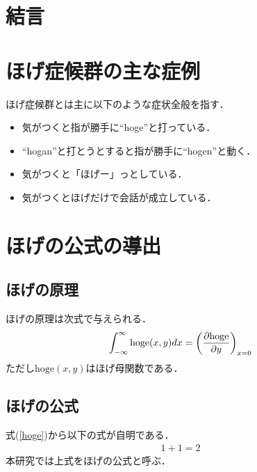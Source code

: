 \begin{small}
\section{結言}

\section{ほげ症候群の主な症例}
ほげ症候群とは主に以下のような症状全般を指す\cite{Hondo:hohoge2006}．
\begin{itemize}
\item 気がつくと指が勝手に``hoge''と打っている．
\item ``hogan''と打とうとすると指が勝手に``hogen''と動く．
\item 気がつくと「ほげー」っとしている．
\item 気がつくとほげだけで会話が成立している．
\end{itemize}
\section{ほげの公式の導出}
\subsection{ほげの原理}
ほげの原理は次式で与えられる\cite{Kawamura:hogege2010}．
\begin{eqnarray}
\int_{-\infty}^\infty \mathrm{hoge}(x,y) dx = \left( \frac{\partial \mathrm{hoge}}{\partial y} \label{hoge} \right)_{x = 0}
\end{eqnarray}
ただし$\mathrm{hoge}(x,y)$はほげ母関数である．
\subsection{ほげの公式}
式(\ref{hoge})から以下の式が自明である．
\begin{eqnarray}
1 + 1 = 2
\end{eqnarray}
本研究では上式をほげの公式と呼ぶ．

\end{small}
